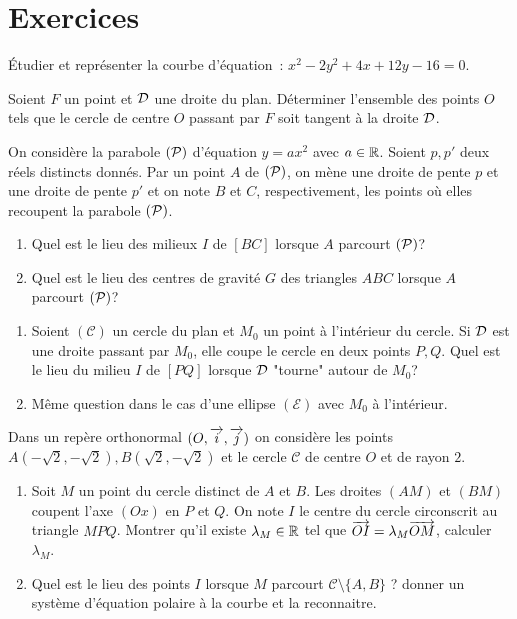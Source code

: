 \section{Exercices}
\begin{exercice}
  Étudier et représenter la courbe d'équation~: 
  \(x^2-2y^2+4x+12y-16=0\).
\end{exercice}
\begin{exercice}
  Soient \(F\) un point et \(\Dr\) une droite du plan. Déterminer 
  l'ensemble des points \(O\) tels que le cercle de centre \(O\) passant 
  par \(F\) soit tangent à la droite \(\Dr\).
\end{exercice}
\begin{exercice}
  On considère la parabole \((\P)\) d'équation \(y=ax^2\) avec \(a \in 
  \R\). Soient \(p, p'\) deux réels distincts donnés. Par un point \(A\) 
  de \((\P)\), on mène une droite de pente \(p\) et une droite de pente 
  \(p'\) et on note \(B\) et \(C\), respectivement, les points où elles 
  recoupent la parabole \((\P)\).
  \begin{enumerate}
    \item Quel est le lieu des milieux \(I\) de \([BC]\) lorsque \(A\) 
      parcourt \((\P)\)?
    \item Quel est le lieu des centres de gravité \(G\) des triangles 
      \(ABC\) lorsque \(A\) parcourt \((\P)\)?
  \end{enumerate}
\end{exercice}
\begin{exercice}
  \begin{enumerate}
    \item Soient \((\mathcal{C})\) un cercle du plan et \(M_0\) un point 
      à l'intérieur du cercle. Si \(\Dr\) est une droite passant par 
      \(M_0\), elle coupe le cercle en deux points \(P, Q\). Quel est le 
      lieu du milieu \(I\) de \([PQ]\) lorsque \(\Dr\) "tourne" autour 
      de \(M_0\)?
    \item Même question dans le cas d'une ellipse \((\mathcal{E})\) avec 
      \(M_0\) à l'intérieur.
  \end{enumerate}
\end{exercice}
\begin{exercice}
  Dans un repère orthonormal \((O, \vi, \vj)\) on considère les points 
  \(A(-\sqrt{2}, -\sqrt{2}), B(\sqrt{2}, -\sqrt{2})\) et le cercle 
  \(\mathcal{C}\) de centre \(O\) et de rayon \(2\).
  \begin{enumerate}
    \item Soit \(M\) un point du cercle distinct de \(A\) et \(B\). Les 
      droites \((AM)\) et \((BM)\) coupent l'axe \((Ox)\) en \(P\) et 
      \(Q\). On note \(I\) le centre du cercle circonscrit au triangle 
      \(MPQ\). Montrer qu'il existe \(\lambda_M \in \R\) tel que 
      \(\vect{OI} = \lambda_M \vect{OM}\), calculer \(\lambda_M\).
    \item Quel est le lieu des points \(I\) lorsque \(M\) parcourt 
      \(\mathcal{C}\setminus\{A, B\}\) ? donner un système d'équation 
      polaire à la courbe et la reconnaitre.
  \end{enumerate}
\end{exercice}
